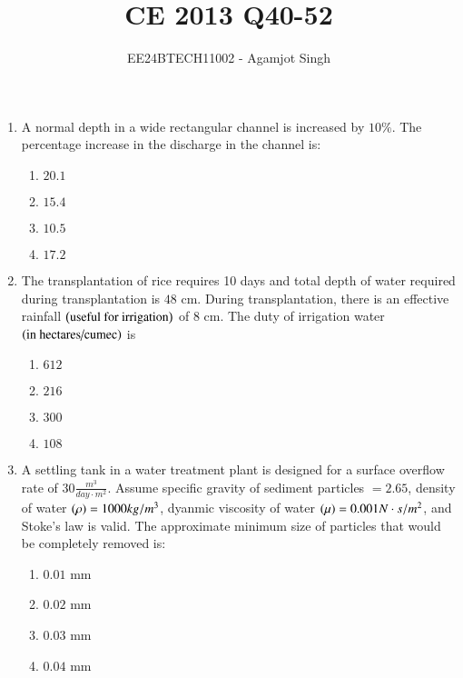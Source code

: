 \documentclass[journal,onecolumn]{IEEEtran}
\theoremstyle{remark}
\begin{document}

\vspace{3cm}

\title{CE 2013 Q40-52}
\author{EE24BTECH11002 - Agamjot Singh}
\maketitle

\renewcommand{\thefigure}{\theenumi}
\renewcommand{\thetable}{\theenumi}

\begin{enumerate}
    \item A normal depth in a wide rectangular channel is increased by $10\%$. The percentage increase in the discharge in the channel is:
	\hfill{}

	\begin{enumerate}
		\item $20.1$
		\item $15.4$
		\item $10.5$
		\item $17.2$
	\end{enumerate}

    \item The transplantation of rice requires 10 days and total depth of water required during transplantation is $48$ cm. During transplantation, there is an effective rainfall $\left(\text{useful for irrigation}\right)$ of $8$ cm. The duty of irrigation water $\left(\text{in hectares/cumec}\right)$ is
	\hfill{}

	\begin{enumerate}
		\item $612$
		\item $216$
		\item $300$
		\item $108$
	\end{enumerate}

    \item A settling tank in a water treatment plant is designed for a surface overflow rate of $30 \frac{m^3}{day\cdot m^2}$. Assume specific gravity of sediment particles $= 2.65$, density of water $\left(\rho\right) = 1000 kg/m^3$, dyanmic viscosity of water $\left(\mu\right) = 0.001 N\cdot s/m^2$, and Stoke's law is valid. The approximate minimum size of particles that would be completely removed is:
	\hfill{}

	\begin{enumerate}
		\item $0.01$ mm
		\item $0.02$ mm
		\item $0.03$ mm
		\item $0.04$ mm
	\end{enumerate}



\end{enumerate}
\end{document}

